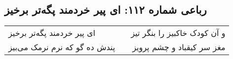 \begin{center}
\section*{رباعی شماره ۱۱۲: ای پیر خردمند پگه‌تر برخیز}
\label{sec:sh112}
\begin{longtable}{l p{0.5cm} r}
ای پیر خردمند پگه‌تر برخیز
&&
و آن کودک خاکبیز را بنگر تیز
\\
پندش ده گو که نرم نرمک می‌بیز
&&
مغز سر کیقباد و چشم پرویز
\\
\end{longtable}
\end{center}
